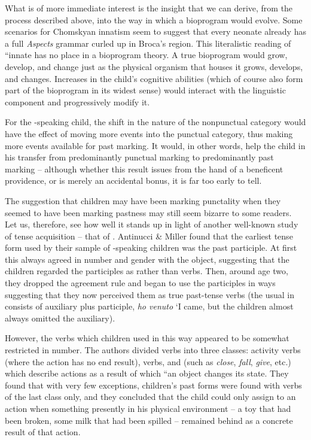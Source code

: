 What is of more immediate interest is the insight that we can derive, from the process described above, into the way in which a bioprogram would evolve. Some scenarios for Chomskyan innatism seem to suggest that every neonate already has a full \textit{Aspects} grammar curled
up in Broca's region. This literalistic reading of ``innate has no place in a bioprogram theory. A true bioprogram would grow, develop, and change just as the physical organism that houses it grows, develops, and changes. Increases in the child's cognitive abilities (which of course also form part of the bioprogram in its widest sense) would interact with the linguistic component and progressively modify it.

For the -speaking child, the shift in the nature of the nonpunctual category would have the effect of moving more events into the punctual category, thus making more events available for past marking. It would, in other words, help the child in his transfer from predominantly punctual marking to predominantly past marking -- although whether this result issues from the hand of a beneficent providence, or is merely an accidental bonus, it is far too early to tell.

The suggestion that children may have been marking punctality when they seemed to have been marking pastness may still seem bizarre to some readers. Let us, therefore, see how well it stands up in light of another well-known study of tense acquisition -- that of \citet{AntinucciEtAl1976}.
Antinucci \& Miller found that the earliest tense form used by their sample of -speaking children was the past participle. At first this always agreed in number and gender with the  object, suggesting that the children regarded the participles as  rather than verbs. Then, around age two, they dropped the agreement rule and began to use the participles in ways suggesting that they now perceived them as true past-tense verbs (the usual  in  consists of auxiliary plus participle, \textit{ho venuto} `I came, but the children almost always omitted the auxiliary).

However, the verbs which children used in this way appeared to be somewhat restricted in number. The authors divided verbs into three classes: activity verbs (where the action has no end result),  verbs, and  (such as \textit{close}, \textit{fall}, \textit{give}, etc.) which describe actions as a result of which ``an object changes its state. They found that with very few exceptions, children's past
forms were found with verbs of the last class only, and they concluded that the child could only assign  to an action when some\-thing presently in his physical environment -- a toy that had been broken, some milk that had been spilled -- remained behind as a concrete result of that action.


